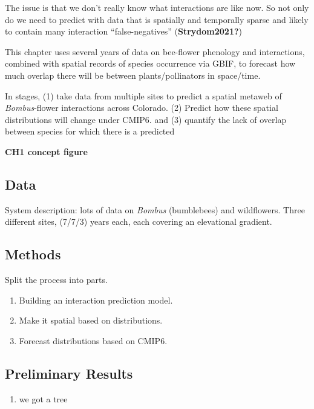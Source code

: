 \documentclass[10pt,oneside]{article}
\begin{document}
The issue is that we don't really know what interactions are like now.
So not only do we need to predict with data that is spatially and
temporally sparse and likely to contain many interaction
``false-negatives'' (\textbf{Strydom2021?})

This chapter uses several years of data on bee-flower phenology and
interactions, combined with spatial records of species occurrence via
GBIF, to forecast how much overlap there will be between
plants/pollinators in space/time.

In stages, (1) take data from multiple sites to predict a spatial
metaweb of \emph{Bombus}-flower interactions across Colorado. (2)
Predict how these spatial distributions will change under CMIP6. and (3)
quantify the lack of overlap between species for which there is a
predicted

\textbf{CH1 concept figure}

\hypertarget{data}{%
\subsection{Data}\label{data}}

System description: lots of data on \emph{Bombus} (bumblebees) and
wildflowers. Three different sites, (7/7/3) years each, each covering an
elevational gradient.

\hypertarget{methods}{%
\subsection{Methods}\label{methods}}

Split the process into parts.

\begin{enumerate}
\def\labelenumi{\arabic{enumi})}
\tightlist
\item
  Building an interaction prediction model.
\item
  Make it spatial based on distributions.
\item
  Forecast distributions based on CMIP6.
\end{enumerate}

\hypertarget{preliminary-results}{%
\subsection{Preliminary Results}\label{preliminary-results}}

\begin{enumerate}
\def\labelenumi{\arabic{enumi})}
\tightlist
\item
  we got a tree
\end{enumerate}
\end{document}

